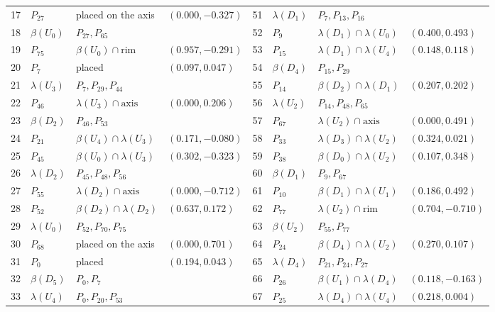 \begin{table}[p]
\begin{tabular}{@{}rlll@{\qquad}rlll@{}}
17 & $P_{27}$ & placed on the axis & $(0.000, -0.327)$ & 51 & $\lambda(D_{1})$ & $P_{7}, P_{13}, P_{16}$ &  \\
18 & $\beta(U_{0})$ & $P_{27}, P_{65}$ &  & 52 & $P_{9}$ & $\lambda(D_{1}) \cap \lambda(U_{0})$ & $(0.400, 0.493)$ \\
19 & $P_{75}$ & $\beta(U_{0}) \cap \text{rim}$ & $(0.957, -0.291)$ & 53 & $P_{15}$ & $\lambda(D_{1}) \cap \lambda(U_{4})$ & $(0.148, 0.118)$ \\
20 & $P_{7}$ & placed & $(0.097, 0.047)$ & 54 & $\beta(D_{4})$ & $P_{15}, P_{29}$ &  \\
21 & $\lambda(U_{3})$ & $P_{7}, P_{29}, P_{44}$ &  & 55 & $P_{14}$ & $\beta(D_{2}) \cap \lambda(D_{1})$ & $(0.207, 0.202)$ \\
22 & $P_{46}$ & $\lambda(U_{3}) \cap \text{axis}$ & $(0.000, 0.206)$ & 56 & $\lambda(U_{2})$ & $P_{14}, P_{48}, P_{65}$ &  \\
23 & $\beta(D_{2})$ & $P_{46}, P_{53}$ &  & 57 & $P_{67}$ & $\lambda(U_{2}) \cap \text{axis}$ & $(0.000, 0.491)$ \\
24 & $P_{21}$ & $\beta(U_{4}) \cap \lambda(U_{3})$ & $(0.171, -0.080)$ & 58 & $P_{33}$ & $\lambda(D_{3}) \cap \lambda(U_{2})$ & $(0.324, 0.021)$ \\
25 & $P_{45}$ & $\beta(U_{0}) \cap \lambda(U_{3})$ & $(0.302, -0.323)$ & 59 & $P_{38}$ & $\beta(D_{0}) \cap \lambda(U_{2})$ & $(0.107, 0.348)$ \\
26 & $\lambda(D_{2})$ & $P_{45}, P_{48}, P_{56}$ &  & 60 & $\beta(D_{1})$ & $P_{9}, P_{67}$ &  \\
27 & $P_{55}$ & $\lambda(D_{2}) \cap \text{axis}$ & $(0.000, -0.712)$ & 61 & $P_{10}$ & $\beta(D_{1}) \cap \lambda(U_{1})$ & $(0.186, 0.492)$ \\
28 & $P_{52}$ & $\beta(D_{2}) \cap \lambda(D_{2})$ & $(0.637, 0.172)$ & 62 & $P_{77}$ & $\lambda(U_{2}) \cap \text{rim}$ & $(0.704, -0.710)$ \\
29 & $\lambda(U_{0})$ & $P_{52}, P_{70}, P_{75}$ &  & 63 & $\beta(U_{2})$ & $P_{55}, P_{77}$ &  \\
30 & $P_{68}$ & placed on the axis & $(0.000, 0.701)$ & 64 & $P_{24}$ & $\beta(D_{4}) \cap \lambda(U_{2})$ & $(0.270, 0.107)$ \\
31 & $P_{0}$ & placed & $(0.194, 0.043)$ & 65 & $\lambda(D_{4})$ & $P_{21}, P_{24}, P_{27}$ &  \\
32 & $\beta(D_{5})$ & $P_{0}, P_{7}$ &  & 66 & $P_{26}$ & $\beta(U_{1}) \cap \lambda(D_{4})$ & $(0.118, -0.163)$ \\
33 & $\lambda(U_{4})$ & $P_{0}, P_{20}, P_{53}$ &  & 67 & $P_{25}$ & $\lambda(D_{4}) \cap \lambda(U_{4})$ & $(0.218, 0.004)$ \\

\end{tabular}
\end{table}

